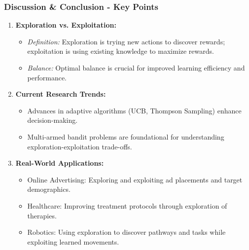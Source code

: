 \documentclass[aspectratio=169]{beamer}
\begin{document}
\begin{frame}[fragile]
    \frametitle{Discussion \& Conclusion - Key Points}
    \begin{enumerate}
        \item \textbf{Exploration vs. Exploitation:}
        \begin{itemize}
            \item \textit{Definition:} Exploration is trying new actions to discover rewards; exploitation is using existing knowledge to maximize rewards.
            \item \textit{Balance:} Optimal balance is crucial for improved learning efficiency and performance.
        \end{itemize}
        
        \item \textbf{Current Research Trends:}
        \begin{itemize}
            \item Advances in adaptive algorithms (UCB, Thompson Sampling) enhance decision-making.
            \item Multi-armed bandit problems are foundational for understanding exploration-exploitation trade-offs.
        \end{itemize}
        
        \item \textbf{Real-World Applications:}
        \begin{itemize}
            \item Online Advertising: Exploring and exploiting ad placements and target demographics.
            \item Healthcare: Improving treatment protocols through exploration of therapies.
            \item Robotics: Using exploration to discover pathways and tasks while exploiting learned movements.
        \end{itemize}
    \end{enumerate}
\end{frame}
\end{document}
